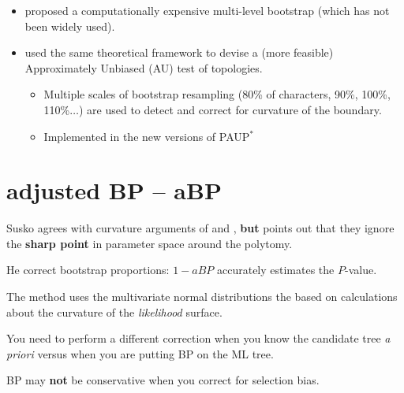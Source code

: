 \myNewSlide
\begin{itemize}
    \item \citet{EfronHH1996}  proposed a computationally expensive multi-level bootstrap (which has not been widely used).
    \item \citet{Shimodaira2002} used the same theoretical framework to devise a (more feasible) Approximately Unbiased (AU) test of topologies.
    \begin{itemize}
        \item Multiple scales of bootstrap resampling (80\% of characters, 90\%, 100\%, 110\%$\ldots$) are used to detect and correct for curvature of the boundary.
        \item Implemented in the new versions of PAUP$^{\ast}$
    \end{itemize}
\end{itemize}

\myNewSlide
\section*{\cite{Susko2010} adjusted BP -- aBP}
\large
\begin{compactitem}
    \item Susko agrees with curvature arguments of \citet{EfronHH1996} and \citet{Shimodaira2002}, {\bf but} points out that they ignore the {\bf sharp point} in parameter space around the polytomy.

    \item He correct bootstrap proportions:  $1-aBP$ accurately estimates the $P$-value.

    \item The method uses the multivariate normal distributions the based on calculations about the curvature of the {\em likelihood} surface.

    \item You need to perform a different correction when you know the candidate tree {\em a priori} versus when you are putting BP on the ML tree.

    \item BP may {\bf not} be conservative when you correct for selection bias.
\end{compactitem}

